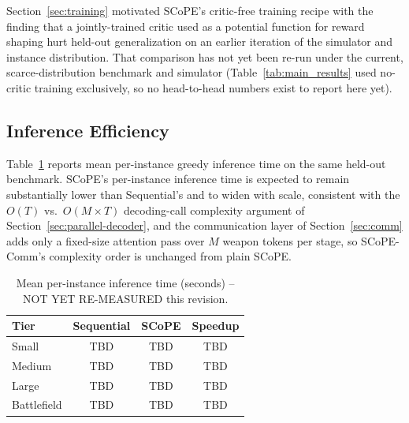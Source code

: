 Section~\ref{sec:training} motivated SCoPE's critic-free training recipe with the finding that a jointly-trained critic used as a potential function for reward shaping hurt held-out generalization on an earlier iteration of the simulator and instance distribution. That comparison has not yet been re-run under the current, scarce-distribution benchmark and simulator (Table~\ref{tab:main_results} used no-critic training exclusively, so no head-to-head numbers exist to report here yet).


\subsection{Inference Efficiency}
\label{sec:efficiency}

Table~\ref{tab:efficiency} reports mean per-instance greedy inference time on the same held-out benchmark. SCoPE's per-instance inference time is expected to remain substantially lower than Sequential's and to widen with scale, consistent with the $O(T)$ vs.\ $O(M{\times}T)$ decoding-call complexity argument of Section~\ref{sec:parallel-decoder}, and the communication layer of Section~\ref{sec:comm} adds only a fixed-size attention pass over $M$ weapon tokens per stage, so SCoPE-Comm's complexity order is unchanged from plain SCoPE.

\begin{table}[htbp]
\centering
\small
\caption{Mean per-instance inference time (seconds) -- NOT YET RE-MEASURED this revision.}
\label{tab:efficiency}
\begin{tabular}{l|ccc}
\hline
\textbf{Tier} & \textbf{Sequential} & \textbf{SCoPE} & \textbf{Speedup} \\ \hline
Small & TBD & TBD & TBD \\
Medium & TBD & TBD & TBD \\
Large & TBD & TBD & TBD \\
Battlefield & TBD & TBD & TBD \\ \hline
\end{tabular}
\end{table}

